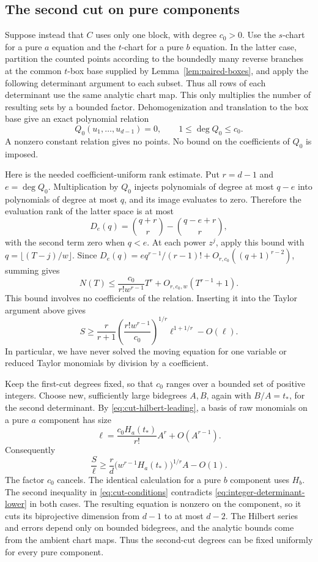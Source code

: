 \subsection{The second cut on pure components}

Suppose instead that \(C\) uses only one block, with degree \(c_0>0\).
Use the \(s\)-chart for a pure \(a\) equation and the \(t\)-chart
for a pure \(b\) equation.  In the latter case, partition the counted
points according to the boundedly many reverse branches at the common
\(t\)-box base supplied by Lemma~\ref{lem:paired-boxes}, and apply the
following determinant argument to each subset.  Thus all rows of each
determinant use the same analytic chart map.  This only multiplies the
number of resulting sets by a bounded factor.
Dehomogenization and translation to the
box base give an exact polynomial relation
\[
 Q_0(u_1,\ldots,u_{d-1})=0,\qquad 1\leq\deg Q_0\leq c_0.
\]
A nonzero constant relation gives no points.  No bound on the
coefficients of \(Q_0\) is imposed.

Here is the needed coefficient-uniform rank estimate.  Put
\(r=d-1\) and \(e=\deg Q_0\).
Multiplication by \(Q_0\) injects polynomials of degree at most
\(q-e\) into polynomials of degree at most \(q\), and its image
evaluates to zero.  Therefore the evaluation rank of the latter
space is at most
\[
 D_e(q)=\binom{q+r}{r}-\binom{q-e+r}{r},
\]
with the second term zero when \(q<e\).
At each power \(z^j\), apply this bound with
\(q=\lfloor(T-j)/w\rfloor\).  Since
\(D_e(q)=e q^{r-1}/(r-1)!+O_{r,c_0}((q+1)^{r-2})\), summing gives
\[
 N(T)\leq
 \frac{c_0}{r!w^{r-1}}T^r+O_{r,c_0,w}(T^{r-1}+1).
\]
This bound involves no coefficients of the relation.
Inserting it into the Taylor argument above gives
\[
 S\geq\frac r{r+1}
 \left(\frac{r!w^{r-1}}{c_0}\right)^{1/r}
 \ell^{1+1/r}-O(\ell).
\]
In particular, we have never solved the moving equation for one
variable or reduced Taylor monomials by division by a coefficient.

Keep the first-cut degrees fixed, so that \(c_0\) ranges over a
bounded set of positive integers.  Choose new, sufficiently large
bidegrees \(A,B\), again with \(B/A=t_*\), for the second determinant.
By \eqref{eq:cut-hilbert-leading}, a basis of raw monomials on a
pure \(a\) component has size
\[
 \ell=\frac{c_0H_a(t_*)}{r!}A^r+O(A^{r-1}).
\]
Consequently
\[
 \frac S\ell\geq
 \frac r d\bigl(w^{r-1}H_a(t_*)\bigr)^{1/r}A-O(1).
\]
The factor \(c_0\) cancels.  The identical calculation for a pure
\(b\) component uses \(H_b\).  The second inequality in
\eqref{eq:cut-conditions} contradicts
\eqref{eq:integer-determinant-lower} in both cases.
The resulting equation is nonzero on the component, so it cuts
its biprojective dimension from \(d-1\) to at most \(d-2\).
The Hilbert series and errors depend only on bounded bidegrees,
and the analytic bounds come from the ambient chart maps.
Thus the second-cut degrees can be fixed uniformly for every
pure component.

